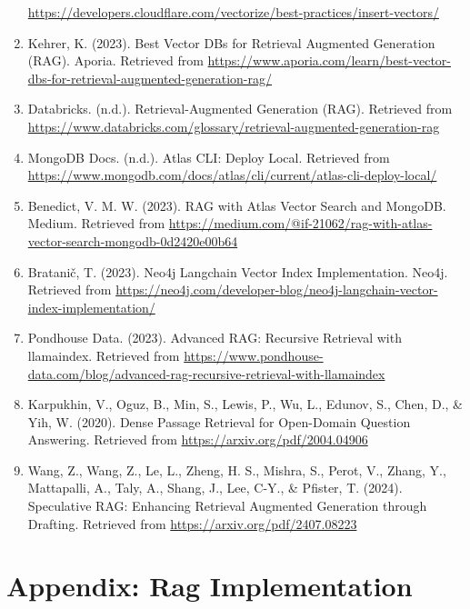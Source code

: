 \documentclass[11pt]{wseas}
\begin{document}
\begin{enumerate}
  \url{https://developers.cloudflare.com/vectorize/best-practices/insert-vectors/}
\item
  Kehrer, K. (2023). Best Vector DBs for Retrieval Augmented Generation
  (RAG). Aporia. Retrieved from
  \url{https://www.aporia.com/learn/best-vector-dbs-for-retrieval-augmented-generation-rag/}
\item
  Databricks. (n.d.). Retrieval-Augmented Generation (RAG). Retrieved
  from
  \url{https://www.databricks.com/glossary/retrieval-augmented-generation-rag}
\item
  MongoDB Docs. (n.d.). Atlas CLI: Deploy Local. Retrieved from
  \url{https://www.mongodb.com/docs/atlas/cli/current/atlas-cli-deploy-local/}
\item
  Benedict, V. M. W. (2023). RAG with Atlas Vector Search and MongoDB.
  Medium. Retrieved from
  \href{https://medium.com/@if-21062/rag-with-atlas-vector-search-mongodb-0d2420e00b64}{https://medium.com/@if-21062/rag-with-atlas-vector-search-mongodb-0d2420e00b64}
\item
  Bratanič, T. (2023). Neo4j Langchain Vector Index Implementation.
  Neo4j. Retrieved from
  \url{https://neo4j.com/developer-blog/neo4j-langchain-vector-index-implementation/}
\item
  Pondhouse Data. (2023). Advanced RAG: Recursive Retrieval with
  llamaindex. Retrieved from
  \url{https://www.pondhouse-data.com/blog/advanced-rag-recursive-retrieval-with-llamaindex}
\item
  Karpukhin, V., Oguz, B., Min, S., Lewis, P., Wu, L., Edunov, S., Chen,
  D., \& Yih, W. (2020). Dense Passage Retrieval for Open-Domain
  Question Answering. Retrieved from
  \url{https://arxiv.org/pdf/2004.04906}
\item
  Wang, Z., Wang, Z., Le, L., Zheng, H. S., Mishra, S., Perot, V.,
  Zhang, Y., Mattapalli, A., Taly, A., Shang, J., Lee, C-Y., \& Pfister,
  T. (2024). Speculative RAG: Enhancing Retrieval Augmented Generation
  through Drafting. Retrieved from
  \url{https://arxiv.org/pdf/2407.08223}
\end{enumerate}

    

    \section{Appendix: Rag
Implementation}\label{appendix-rag-implementation}
\end{document}
